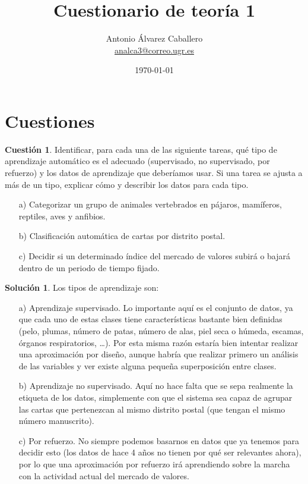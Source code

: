 \documentclass[a4paper, 11pt]{article}
\title{Cuestionario de teoría 1}
\author{Antonio Álvarez Caballero\\
    \href{mailto:analca3@correo.ugr.es}{analca3@correo.ugr.es}}
\date{\today}
\theoremstyle{definition}
\newtheorem{cuestion}{Cuestión}
\newtheorem*{solucion}{Solución}
\begin{document}
  \maketitle

  \section{Cuestiones}

  \begin{cuestion}
    Identificar, para cada una de las siguiente tareas, qué tipo de aprendizaje automático es el adecuado (supervisado, no supervisado, por refuerzo) y los datos de aprendizaje que deberíamos usar. Si una tarea se ajusta a más de un tipo, explicar cómo y describir los datos para cada tipo.
    \begin{enumerate}
      \item[a)] Categorizar un grupo de animales vertebrados en pájaros, mamíferos, reptiles, aves y anfibios.
      \item[b)] Clasificación automática de cartas por distrito postal.
      \item[c)] Decidir si un determinado índice del mercado de valores subirá o bajará dentro de un periodo de tiempo fijado.
    \end{enumerate}

  \end{cuestion}

  \begin{solucion}
    Los tipos de aprendizaje son:
    \begin{enumerate}
      \item[a)] Aprendizaje supervisado. Lo importante aquí es el conjunto de datos, ya que cada uno de estas clases tiene características bastante bien definidas (pelo, plumas, número de patas, número de alas, piel seca o húmeda, escamas, órganos respiratorios, \ldots). Por esta misma razón estaría bien intentar realizar una aproximación por diseño, aunque habría que realizar primero un análisis de las variables y ver existe alguna pequeña superposición entre clases.
      \item[b)] Aprendizaje no supervisado. Aquí no hace falta que se sepa realmente la etiqueta de los datos, simplemente con que el sistema sea capaz de agrupar las cartas que pertenezcan al mismo distrito postal (que tengan el mismo número manuscrito).
      \item[c)] Por refuerzo. No siempre podemos basarnos en datos que ya tenemos para decidir esto (los datos de hace 4 años no tienen por qué ser relevantes ahora), por lo que una aproximación por refuerzo irá aprendiendo sobre la marcha con la actividad actual del mercado de valores.
    \end{enumerate}
  \end{solucion}
\end{document}

